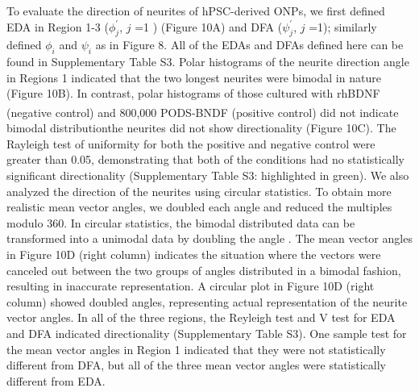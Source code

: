\documentclass[review]{elsarticle}
\begin{document}
To evaluate the direction of neurites of hPSC-derived ONPs, we first defined EDA in Region 1-3 ($\phi^{\prime}_{j}$, $j$ =1 ) (Figure 10A) and DFA ($\psi^{\prime}_{j}$, $j$ =1); similarly defined $\phi_{i}$ and $\psi_{i}$ as in Figure 8. All of the EDAs and DFAs defined here can be found in Supplementary Table S3. Polar histograms of the neurite direction angle in Regions 1 indicated that the two longest neurites were bimodal in nature (Figure 10B).  In contrast, polar histograms of those cultured with rhBDNF (negative control) and 800,000 PODS\textsuperscript{\textregistered}-BNDF (positive control) did not indicate bimodal distribution\textemdash the neurites did not show directionality (Figure 10C). The Rayleigh test of uniformity for both the positive and negative control were greater than 0.05, demonstrating that both of the conditions had no statistically significant directionality (Supplementary Table S3: highlighted in green). We also analyzed the direction of the neurites using circular statistics. To obtain more realistic mean vector angles, we doubled each angle and reduced the multiples modulo 360\degree. In circular statistics, the bimodal distributed data can be transformed into a unimodal data by doubling the angle \cite{Batschelet1981}. The mean vector angles in Figure 10D (right column) indicates the situation where the vectors were canceled out between the two groups of angles distributed in a bimodal fashion, resulting in inaccurate representation. A circular plot in Figure 10D (right column) showed doubled angles, representing actual representation of the neurite vector angles. In all of the three regions, the Reyleigh test and V test for EDA and DFA indicated directionality (Supplementary Table S3). One sample test for the mean vector angles in Region 1 indicated that they were not statistically different from DFA, but all of the three mean vector angles were statistically different from EDA. 
\end{document}
